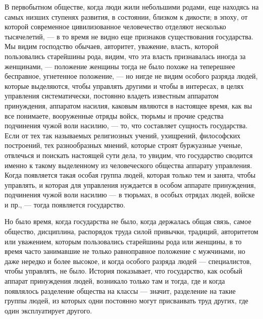 \documentclass[12pt]{article}
\newcommand{\parnum}{(\arabic{parcount})}
\newcounter{parcount}
\newenvironment{parnumbers}{%
  \par%
  \everypar{\noindent \stepcounter{parcount}\marginpar[]{\parnum}}%
}{}
\begin{document}
\begin{parnumbers}
В первобытном обществе, когда люди жили небольшими родами, еще находясь на самых низших ступенях развития, в состоянии, близком к дикости; в эпоху, от которой современное цивилизованное человечество отделяют несколько тысячелетий, — в то время не видно еще признаков существования государства. Мы видим господство обычаев, авторитет, уважение, власть, которой пользовались старейшины рода, видим, что эта власть признавалась иногда за женщинами, — положение женщины тогда не было похоже на теперешнее бесправное, угнетенное положение, — но нигде не видим особого разряда людей, которые выделяются, чтобы управлять другими и чтобы в интересах, в целях управления систематически, постоянно владеть известным аппаратом принуждения, аппаратом насилия, каковым являются в настоящее время, как вы все понимаете, вооруженные отряды войск, тюрьмы и прочие средства подчинения чужой воли насилию, — то, что составляет сущность государства. Если от тех так называемых религиозных учений, ухищрений, философских построений, тех разнообразных мнений, которые строят буржуазные ученые, отвлечься и поискать настоящей сути дела, то увидим, что государство сводится именно к такому выделенному из человеческого общества аппарату управления. Когда появляется такая особая группа людей, которая только тем и занята, чтобы управлять, и которая для управления нуждается в особом аппарате принуждения, подчинения чужой воли насилию — в тюрьмах, в особых отрядах людей, войске и пр., — тогда появляется государство.

Но было время, когда государства не было, когда держалась общая связь, самое общество, дисциплина, распорядок труда силой привычки, традиций, авторитетом или уважением, которым пользовались старейшины рода или женщины, в то время часто занимавшие не только равноправное положение с мужчинами, но даже нередко и более высокое, и когда особого разряда людей — специалистов, чтобы управлять, не было. История показывает, что государство, как особый аппарат принуждения людей, возникало только там и тогда, где и когда появлялось разделение общества на классы — значит, разделение на такие группы людей, из которых одни постоянно могут присваивать труд других, где один эксплуатирует другого.


\end{parnumbers}
\end{document}
